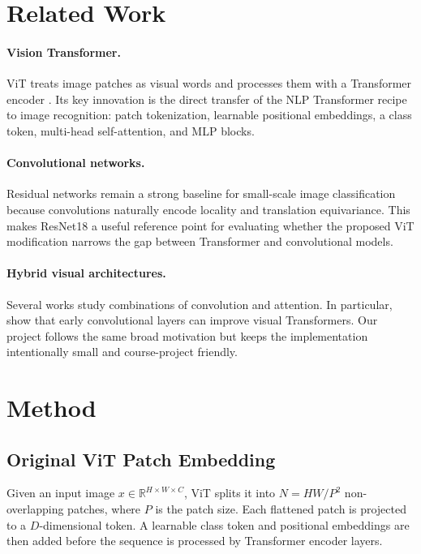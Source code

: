 \documentclass[letterpaper]{article}
\begin{document}
\section{Related Work}

\paragraph{Vision Transformer.}
ViT treats image patches as visual words and processes them with a Transformer
encoder \citep{dosovitskiy2021image}. Its key innovation is the direct transfer
of the NLP Transformer recipe to image recognition: patch tokenization,
learnable positional embeddings, a class token, multi-head self-attention, and
MLP blocks.

\paragraph{Convolutional networks.}
Residual networks \citep{he2016deep} remain a strong baseline for small-scale
image classification because convolutions naturally encode locality and
translation equivariance. This makes ResNet18 a useful reference point for
evaluating whether the proposed ViT modification narrows the gap between
Transformer and convolutional models.

\paragraph{Hybrid visual architectures.}
Several works study combinations of convolution and attention. In particular,
\citet{xiao2021early} show that early convolutional layers can improve visual
Transformers. Our project follows the same broad motivation but keeps the
implementation intentionally small and course-project friendly.

\section{Method}

\subsection{Original ViT Patch Embedding}

Given an input image $x \in \mathbb{R}^{H \times W \times C}$, ViT splits it
into $N = HW/P^2$ non-overlapping patches, where $P$ is the patch size. Each
flattened patch is projected to a $D$-dimensional token. A learnable class token
and positional embeddings are then added before the sequence is processed by
Transformer encoder layers.
\end{document}
